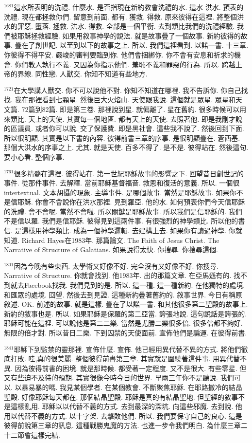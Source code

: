 \documentclass{book}
\begin{document}
$^{1681}$這水所表明的洗禮.
什麼水.
是否指現在新約教會洗禮的水.
這水 洪水.
預表的洗禮.
現在都拯救你們.
留意到前面.
都有.
獲救.
得救.
原來彼得在這裡.
將整個洪水的罪惡.
墮落.
拯救.
洪水.
得救.
全部是一個平衡.
去到類比我們的洗禮經驗.
我們被耶穌拯救經驗.
如果用敘事神學的說法.
就是故事疊了一個故事.
新約彼得的故事.
疊在了創世記.
以至到以下的故事之上.
所以.
我們這裡看到.
以諾一書.
十三章.
你彼得不得平安.
嚴峻的審判要臨到你.
他們會捆綁你.
你不會有安息和祈求的機會.
你們教人執行不義.
又因為你指示他們.
羞恥不義和罪惡的行為.
所以.
跨越上帝的界線.
同性戀.
人獸交.
你知不知道有些地方.

$^{1721}$在大學講人獸交.
你不可以說他不對.
你知不知道在哪裡.
我不告訴你.
你自己找找.
我在那裡看到七顆星.
然後巨大火焰山.
天使跟我說.
這個就是眾星.
眾星和天文篇.
72篇到82篇.
即是第三卷.
那裡說到星.
就偏離了.
星在舊約.
很多時候可以用來類比.
天上的天使.
其實每一個地區.
都有天上的天使.
去照著他.
即是我剛才說的區議員.
或者你可以說.
交了保護費.
即是黑社會.
這些我不說了.
然後回到下面.
所以很明顯.
其實是以下書的內容.
彼得前書三章的序事.
是很明顯疊在.
蒼西基.
那個大洪水的序事之上.
尤其.
就是天使.
百多不得了.
是不是.
彼得站在.
然後這句.
要小心看.
整個序事.

$^{1761}$很多精髓在這裡.
彼得站在.
第一世紀耶穌故事的影響之下.
回望昔日創世記的事件.
從那件事件.
去解釋.
當前耶穌基督福音.
救恩和復活的意義.
所以.
一個很intertextual.
文本胡攝的現象.
主導事件.
是哪個故事.
當然是耶穌故事.
如果你不是信耶穌.
你會不會說你在洪水那裡.
見到羅亞.
他的水.
如何預表你們今天信耶穌的洗禮.
會不會呢.
當然不會啦.
所以關鍵是耶穌故事.
所以我們是信耶穌的.
我們不是信以羅.
我們是信耶穌.
彼得見到這兩件事.
有很強烈的神學類比.
所以他的書信.
是這樣用神學類比.
成為一個神學邏輯.
去建構上去.
如果你有讀過神學.
你就知道.
Richard Hayes在1983年.
那篇論文.
The Faith of Jesus Christ.
The Narrative of Structure of Galatians.
如果說得太快.
你搜尋.
你搜尋這個.

$^{1801}$因為今晚有些東西.
太學術又好像不好.
完全沒有又好像不好.
你搜尋.
Narrative of Structure.
你就會找到.
他1983年.
出的那篇文章.
在亞馬遜有的.
找不到就去Facebook找我.
我們見到的是.
所以.
這一種.
這一種新約.
在他獨特的處境.
和匯眾的處境.
回望.
然後去到見證.
這種新約疊著舊約的.
敘事世界.
今日有稱原敘述.
OK.
前述的故事.
就是這樣.
疊在了以諾一書.
和其他很多第二聖殿的故事上.
新約的敘事也是.
所以.
如果耶穌是保羅的第二亞當.
誇張地說.
這句說話是誇張的.
耶穌可能在這裡.
可以說他是第二二樂.
當然是尤勝二樂很多倍.
很多倍都不夠好.
無限的倍才對.
所以昔日二樂.
下到囚禁的天使面前.
宣佈他們是騙運.
在彼得前書.

$^{1841}$耶穌下到監禁的靈那裡.
宣佈什麼.
宣佈.
他已經用異代替不異的方式.
將他們徹底打敗.
哇,真的很美麗.
整個彼得前書第三章.
其實就是圍繞著這件事.
用異代替不異.
因為彼得前書的困境.
就是那時候.
都受著一定程度.
又不是很大.
有些零星.
但又有些迫不及待的預期.
其實很像今時今日的世界.
早兩三年你不是聽說.
我們可以.
以暴易暴的嗎.
我見某個學者.
在某個教會.
不斷聚焦耶穌.
在耶路撒冷的結晶聖殿.
好像耶穌每天都在.
那個結晶聖殿.
耶穌是真的有結晶聖地.
但聖經的敘事不是這樣亂用.
耶穌以以代替不義的方式.
去到最深的深坑.
向這些邪魔.
去到說.
他用以代替不義的方式.
以十字架.
去擊敗他們.
所以.
我們要保守自己的良心.
這是彼得前說第三章的訊息.
這種戰勝鬼魔的方法.
也進一步令我們明白.
為什麼三章二十二節會這樣完結.
\end{document}
